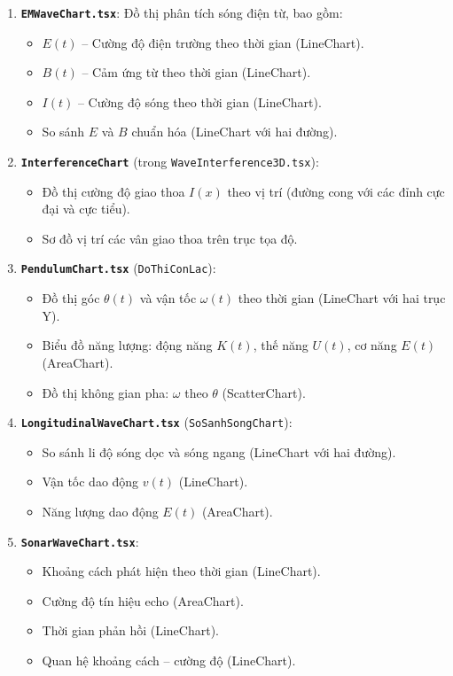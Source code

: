 \begin{enumerate}
    \item \textbf{\texttt{EMWaveChart.tsx}}: Đồ thị phân tích sóng điện từ, bao gồm:
    \begin{itemize}
        \item $E(t)$ – Cường độ điện trường theo thời gian (LineChart).
        \item $B(t)$ – Cảm ứng từ theo thời gian (LineChart).
        \item $I(t)$ – Cường độ sóng theo thời gian (LineChart).
        \item So sánh $E$ và $B$ chuẩn hóa (LineChart với hai đường).
    \end{itemize}
    
    \item \textbf{\texttt{InterferenceChart}} (trong \texttt{WaveInterference3D.tsx}):
    \begin{itemize}
        \item Đồ thị cường độ giao thoa $I(x)$ theo vị trí (đường cong với các đỉnh cực đại và cực tiểu).
        \item Sơ đồ vị trí các vân giao thoa trên trục tọa độ.
    \end{itemize}
    
    \item \textbf{\texttt{PendulumChart.tsx}} (\texttt{DoThiConLac}):
    \begin{itemize}
        \item Đồ thị góc $\theta(t)$ và vận tốc $\omega(t)$ theo thời gian (LineChart với hai trục Y).
        \item Biểu đồ năng lượng: động năng $K(t)$, thế năng $U(t)$, cơ năng $E(t)$ (AreaChart).
        \item Đồ thị không gian pha: $\omega$ theo $\theta$ (ScatterChart).
    \end{itemize}
    
    \item \textbf{\texttt{LongitudinalWaveChart.tsx}} (\texttt{SoSanhSongChart}):
    \begin{itemize}
        \item So sánh li độ sóng dọc và sóng ngang (LineChart với hai đường).
        \item Vận tốc dao động $v(t)$ (LineChart).
        \item Năng lượng dao động $E(t)$ (AreaChart).
    \end{itemize}
    
    \item \textbf{\texttt{SonarWaveChart.tsx}}:
    \begin{itemize}
        \item Khoảng cách phát hiện theo thời gian (LineChart).
        \item Cường độ tín hiệu echo (AreaChart).
        \item Thời gian phản hồi (LineChart).
        \item Quan hệ khoảng cách – cường độ (LineChart).
    \end{itemize}
\end{enumerate}

